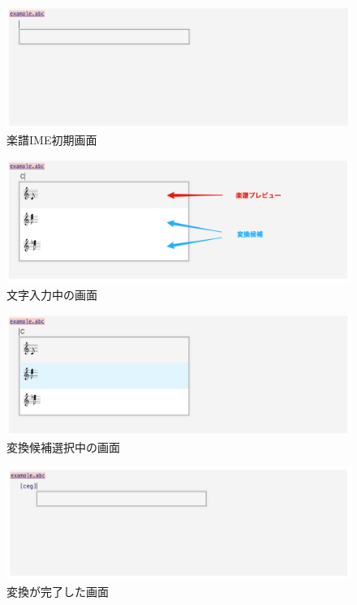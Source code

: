 \begin{figure}[H]
    \centering
    \includegraphics[width=13cm]{images/ime.png}
    \caption{楽譜IME初期画面}
    \label{ime}
\end{figure}

\begin{figure}[H]
    \centering
    \includegraphics[width=13cm]{images/imecandidate.png}
    \caption{文字入力中の画面}
    \label{candidate}
\end{figure}

\begin{figure}[H]
    \centering
    \includegraphics[width=13cm]{images/selectcandidate.png}
    \caption{変換候補選択中の画面}
    \label{select}
\end{figure}

\begin{figure}[H]
    \centering
    \includegraphics[width=13cm]{images/inputcandidate.png}
    \caption{変換が完了した画面}
    \label{input}
\end{figure}

